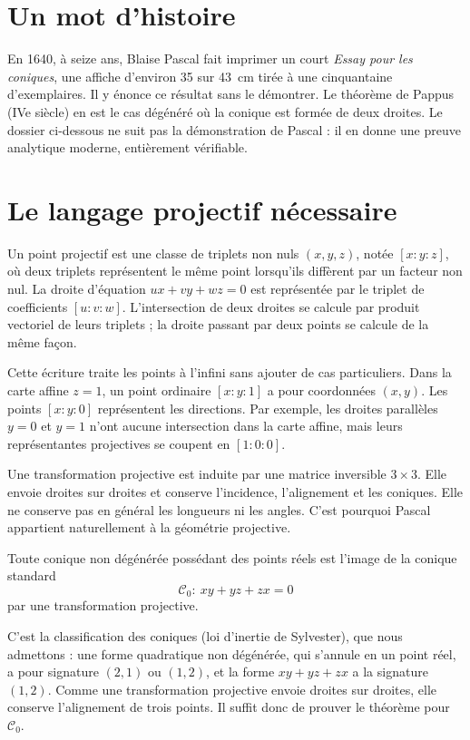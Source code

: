 \section{Un mot d'histoire}
En 1640, à seize ans, Blaise Pascal fait imprimer un court \emph{Essay pour les coniques}, une affiche d'environ 35 sur 43~cm tirée à une cinquantaine d'exemplaires. Il y énonce ce résultat sans le démontrer. Le théorème de Pappus (IVe siècle) en est le cas dégénéré où la conique est formée de deux droites. Le dossier ci-dessous ne suit pas la démonstration de Pascal : il en donne une preuve analytique moderne, entièrement vérifiable.

\section{Le langage projectif nécessaire}
Un point projectif est une classe de triplets non nuls $(x,y,z)$, notée $[x:y:z]$, où deux triplets représentent le même point lorsqu'ils diffèrent par un facteur non nul. La droite d'équation $ux+vy+wz=0$ est représentée par le triplet de coefficients $[u:v:w]$. L'intersection de deux droites se calcule par produit vectoriel de leurs triplets ; la droite passant par deux points se calcule de la même façon.

Cette écriture traite les points à l'infini sans ajouter de cas particuliers. Dans la carte affine $z=1$, un point ordinaire $[x:y:1]$ a pour coordonnées $(x,y)$. Les points $[x:y:0]$ représentent les directions. Par exemple, les droites parallèles $y=0$ et $y=1$ n'ont aucune intersection dans la carte affine, mais leurs représentantes projectives se coupent en $[1:0:0]$.

Une transformation projective est induite par une matrice inversible $3\times3$. Elle envoie droites sur droites et conserve l'incidence, l'alignement et les coniques. Elle ne conserve pas en général les longueurs ni les angles. C'est pourquoi Pascal appartient naturellement à la géométrie projective.

\begin{proposition}
Toute conique non dégénérée possédant des points réels est l'image de la conique standard
\[
 \mathcal C_0:\ xy+yz+zx=0
\]
par une transformation projective.
\end{proposition}

C'est la classification des coniques (loi d'inertie de Sylvester), que nous admettons : une forme quadratique non dégénérée, qui s'annule en un point réel, a pour signature $(2,1)$ ou $(1,2)$, et la forme $xy+yz+zx$ a la signature $(1,2)$. Comme une transformation projective envoie droites sur droites, elle conserve l'alignement de trois points. Il suffit donc de prouver le théorème pour $\mathcal C_0$.

